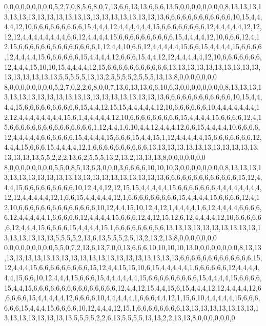 0,0,0,0,0,0,0,0,0,5,2,7,0,8,5,6,8,0,7,13,6,6,13,13,6,6,6,13,5,0,0,0,0,0,0,0,0,8,13,13,13,13,13,13,13,13,13,13,13,13,13,13,13,13,13,13,13,13,13,6,6,6,6,6,6,6,6,6,6,6,6,10,15,4,4,4,4,12,10,6,6,6,6,6,6,6,6,6,15,4,4,4,12,4,4,4,4,4,4,15,6,6,6,6,6,6,6,6,12,4,4,4,4,4,12,12,12,12,4,4,4,4,4,4,4,4,6,6,12,4,4,4,4,15,6,6,6,6,6,6,6,6,6,6,15,4,4,4,4,12,10,6,6,6,12,4,12,15,6,6,6,6,6,6,6,6,6,6,6,6,6,6,1,12,4,4,10,6,6,12,4,4,4,4,4,15,6,6,15,4,4,4,4,15,6,6,6,6,12,4,4,4,4,15,6,6,6,6,6,6,15,4,4,4,4,12,6,6,6,15,4,4,12,12,4,4,4,4,4,12,10,6,6,6,6,6,6,6,12,4,4,4,15,10,10,15,4,4,4,4,12,15,6,6,6,6,6,6,6,6,6,6,6,13,13,13,13,13,13,13,13,13,13,13,13,13,13,13,13,5,5,5,5,5,13,13,2,5,5,5,5,2,5,5,5,13,13,8,0,0,0,0,0,0,0
8,0,0,0,0,0,0,0,0,5,2,7,0,2,2,6,8,0,0,7,13,6,13,13,6,6,10,6,3,0,0,0,0,0,0,0,0,8,13,13,13,13,13,13,13,13,13,13,13,13,13,13,13,13,13,13,13,13,13,6,6,6,6,6,6,6,6,6,6,6,6,10,15,4,4,4,4,15,6,6,6,6,6,6,6,6,6,6,15,4,4,12,15,15,4,4,4,4,4,12,10,6,6,6,6,6,6,10,4,4,4,4,4,4,4,12,12,4,4,4,4,4,4,4,4,15,6,1,4,4,4,4,4,12,10,6,6,6,6,6,6,6,6,6,15,4,4,4,4,15,6,6,6,6,12,4,15,6,6,6,6,6,6,6,6,6,6,6,6,6,6,6,1,12,4,4,1,6,10,4,4,12,4,4,4,12,6,6,15,4,4,4,4,10,6,6,6,6,12,4,4,4,4,4,6,6,6,6,6,6,15,4,4,4,4,15,6,6,6,15,4,4,15,1,12,4,4,4,4,4,15,6,6,6,6,6,6,6,12,4,4,4,15,6,6,6,15,4,4,4,4,12,1,6,6,6,6,6,6,6,6,6,6,13,13,13,13,13,13,13,13,13,13,13,13,13,13,13,13,5,5,2,2,2,13,6,2,5,5,5,13,2,13,2,13,13,13,8,0,0,0,0,0,0,0
8,0,0,0,0,0,0,0,0,5,5,0,8,5,13,6,3,0,0,0,3,6,6,6,6,10,10,10,3,0,0,0,0,0,0,0,0,8,13,13,13,13,13,13,13,13,13,13,13,13,13,13,13,13,13,13,13,13,13,6,6,6,6,6,6,6,6,6,6,6,6,6,15,12,4,4,4,15,6,6,6,6,6,6,6,6,6,10,12,4,4,12,12,15,15,4,4,4,4,4,15,6,6,6,6,6,6,6,4,4,4,4,4,4,4,4,12,12,4,4,4,4,4,12,1,6,6,15,4,4,4,4,4,12,1,6,6,6,6,6,6,6,6,6,15,4,4,4,4,15,6,6,6,6,12,4,12,10,6,6,6,6,6,6,6,6,6,6,6,6,6,6,10,12,4,4,15,10,12,4,12,1,4,4,4,4,1,6,12,4,4,4,4,6,6,6,6,6,12,4,4,4,4,4,1,6,6,6,6,6,12,4,4,4,4,15,6,6,6,12,4,12,15,12,6,12,4,4,4,4,12,10,6,6,6,6,6,6,12,4,4,4,15,6,6,6,6,15,4,4,4,4,15,1,6,6,6,6,6,6,6,6,6,13,13,13,13,13,13,13,13,13,13,13,13,13,13,13,13,5,5,5,5,2,13,6,13,5,5,5,2,5,13,2,13,2,13,8,0,0,0,0,0,0,0
0,0,0,0,0,0,0,0,0,5,5,0,7,2,13,6,13,7,0,0,13,6,6,6,10,10,10,10,13,0,0,0,0,0,0,0,0,8,13,13,13,13,13,13,13,13,13,13,13,13,13,13,13,13,13,13,13,13,13,6,6,6,6,6,6,6,6,6,6,6,6,6,15,12,4,4,4,15,6,6,6,6,6,6,6,6,6,15,12,4,4,15,15,10,6,15,4,4,4,4,4,1,6,6,6,6,6,6,12,4,4,4,4,4,4,15,6,6,10,12,4,4,4,15,6,6,6,15,4,4,4,4,4,4,15,6,6,6,6,6,6,6,6,6,15,4,4,4,4,15,6,6,6,6,15,4,4,15,6,6,6,6,6,6,6,6,6,6,6,6,6,6,6,12,4,4,12,15,4,4,15,6,15,4,4,4,12,12,4,4,4,4,12,6,6,6,6,6,15,4,4,4,4,4,12,6,6,6,6,10,4,4,4,4,4,1,6,6,6,4,4,12,1,15,6,10,4,4,4,4,4,15,6,6,6,6,6,6,15,4,4,4,15,6,6,6,6,10,12,4,4,4,12,15,1,6,6,6,6,6,6,6,6,13,13,13,13,13,13,13,13,13,13,13,13,13,13,13,13,5,5,5,5,2,2,6,13,5,5,5,5,13,13,2,2,13,13,8,0,0,0,0,0,0,0
